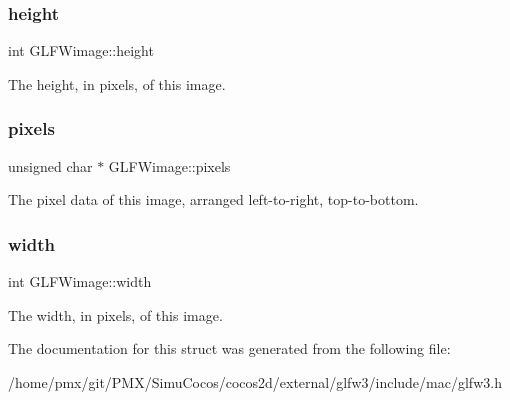 \subsubsection{\texorpdfstring{height}{height}}
{\footnotesize\ttfamily int G\+L\+F\+Wimage\+::height}

The height, in pixels, of this image. \mbox{\label{structGLFWimage_a65a8d70274a35e7342f87703e233a70c}} 
\subsubsection{\texorpdfstring{pixels}{pixels}}
{\footnotesize\ttfamily unsigned char $\ast$ G\+L\+F\+Wimage\+::pixels}

The pixel data of this image, arranged left-\/to-\/right, top-\/to-\/bottom. \mbox{\label{structGLFWimage_af6a71cc999fe6d3aea31dd7e9687d835}} 
\subsubsection{\texorpdfstring{width}{width}}
{\footnotesize\ttfamily int G\+L\+F\+Wimage\+::width}

The width, in pixels, of this image. 

The documentation for this struct was generated from the following file\+:\begin{DoxyCompactItemize}
\item 
/home/pmx/git/\+P\+M\+X/\+Simu\+Cocos/cocos2d/external/glfw3/include/mac/glfw3.\+h\end{DoxyCompactItemize}
